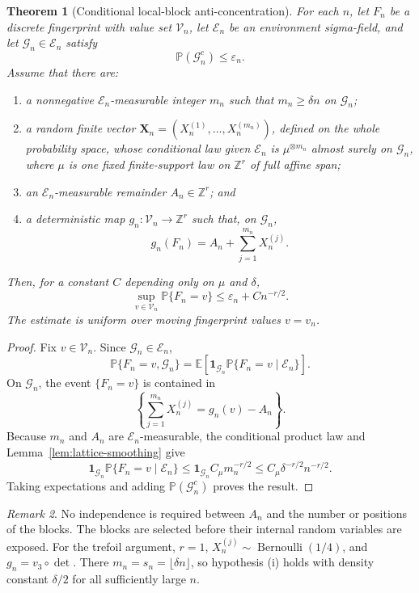 \documentclass[9pt,twoside]{pnas-new}
\newtheorem{theorem}{Theorem}
\theoremstyle{definition}
\theoremstyle{remark}
\newtheorem{remark}[theorem]{Remark}
\renewcommand{\Pr}{\mathbb{P}}
\begin{document}
\begin{theorem}[Conditional local-block anti-concentration]
\label{thm:conditional-local-block}
For each $n$, let $F_n$ be a discrete fingerprint with value set $\mathcal V_n$, let $\mathcal E_n$ be an environment sigma-field, and let $\mathcal G_n\in\mathcal E_n$ satisfy
\[
 \Pr(\mathcal G_n^c)\le\varepsilon_n.
\]
Assume that there are:
\begin{enumerate}[label=(\roman*)]
\item a nonnegative $\mathcal E_n$-measurable integer $m_n$ such that $m_n\ge\delta n$ on $\mathcal G_n$;
\item a random finite vector $\mathbf X_n=(X_n^{(1)},\ldots,X_n^{(m_n)})$, defined on the whole probability space, whose conditional law given $\mathcal E_n$ is $\mu^{\otimes m_n}$ almost surely on $\mathcal G_n$, where $\mu$ is one fixed finite-support law on $\mathbb Z^r$ of full affine span;
\item an $\mathcal E_n$-measurable remainder $A_n\in\mathbb Z^r$; and
\item a deterministic map $g_n:\mathcal V_n\to\mathbb Z^r$ such that, on $\mathcal G_n$,
\[
 g_n(F_n)=A_n+\sum_{j=1}^{m_n}X_n^{(j)}.
\]
\end{enumerate}
Then, for a constant $C$ depending only on $\mu$ and $\delta$,
\[
 \sup_{v\in\mathcal V_n}\Pr\{F_n=v\}
 \le\varepsilon_n+Cn^{-r/2}.
\]
The estimate is uniform over moving fingerprint values $v=v_n$.
\end{theorem}

\begin{proof}
Fix $v\in\mathcal V_n$. Since $\mathcal G_n\in\mathcal E_n$,
\[
 \Pr\{F_n=v,\mathcal G_n\}
 =\mathbb E\!\left[\mathbf 1_{\mathcal G_n}\Pr\{F_n=v\mid\mathcal E_n\}\right].
\]
On $\mathcal G_n$, the event $\{F_n=v\}$ is contained in
\[
 \left\{\sum_{j=1}^{m_n}X_n^{(j)}=g_n(v)-A_n\right\}.
\]
Because $m_n$ and $A_n$ are $\mathcal E_n$-measurable, the conditional product law and Lemma~\ref{lem:lattice-smoothing} give
\[
 \mathbf 1_{\mathcal G_n}\Pr\{F_n=v\mid\mathcal E_n\}
 \le
 \mathbf 1_{\mathcal G_n}C_\mu m_n^{-r/2}
 \le C_\mu\delta^{-r/2}n^{-r/2}.
\]
Taking expectations and adding $\Pr(\mathcal G_n^c)$ proves the result.
\end{proof}

\begin{remark}
No independence is required between $A_n$ and the number or positions of the blocks. The blocks are selected before their internal random variables are exposed. For the trefoil argument, $r=1$, $X_n^{(j)}\sim\operatorname{Bernoulli}(1/4)$, and $g_n=v_3\circ\det$.  There $m_n=s_n=\lfloor\delta n\rfloor$, so hypothesis (i) holds with density constant $\delta/2$ for all sufficiently large $n$.
\end{remark}
\end{document}
